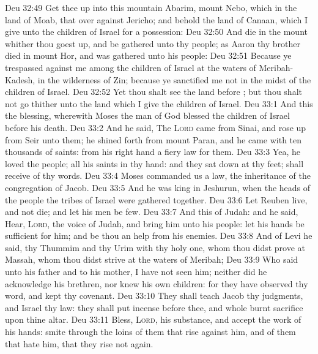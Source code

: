 \vs Deu 32:49 Get thee up into this mountain Abarim,  mount Nebo, which  in the land of Moab, that  over against Jericho; and behold the land of Canaan, which I give unto the children of Israel for a possession:
\vs Deu 32:50 And die in the mount whither thou goest up, and be gathered unto thy people; as Aaron thy brother died in mount Hor, and was gathered unto his people:
\vs Deu 32:51 Because ye trespassed against me among the children of Israel at the waters of Meribah-Kadesh, in the wilderness of Zin; because ye sanctified me not in the midst of the children of Israel.
\vs Deu 32:52 Yet thou shalt see the land before ; but thou shalt not go thither unto the land which I give the children of Israel.
\vs Deu 33:1 And this  the blessing, wherewith Moses the man of God blessed the children of Israel before his death.
\vs Deu 33:2 And he said, The \textsc{Lord} came from Sinai, and rose up from Seir unto them; he shined forth from mount Paran, and he came with ten thousands of saints: from his right hand  a fiery law for them.
\vs Deu 33:3 Yea, he loved the people; all his saints  in thy hand: and they sat down at thy feet;  shall receive of thy words.
\vs Deu 33:4 Moses commanded us a law,  the inheritance of the congregation of Jacob.
\vs Deu 33:5 And he was king in Jeshurun, when the heads of the people  the tribes of Israel were gathered together.
\vs Deu 33:6 Let Reuben live, and not die; and let  his men be few.
\vs Deu 33:7 And this  of Judah: and he said, Hear, \textsc{Lord}, the voice of Judah, and bring him unto his people: let his hands be sufficient for him; and be thou an help  from his enemies.
\vs Deu 33:8 And of Levi he said,  thy Thummim and thy Urim  with thy holy one, whom thou didst prove at Massah,  whom thou didst strive at the waters of Meribah;
\vs Deu 33:9 Who said unto his father and to his mother, I have not seen him; neither did he acknowledge his brethren, nor knew his own children: for they have observed thy word, and kept thy covenant.
\vs Deu 33:10 They shall teach Jacob thy judgments, and Israel thy law: they shall put incense before thee, and whole burnt sacrifice upon thine altar.
\vs Deu 33:11 Bless, \textsc{Lord}, his substance, and accept the work of his hands: smite through the loins of them that rise against him, and of them that hate him, that they rise not again.
